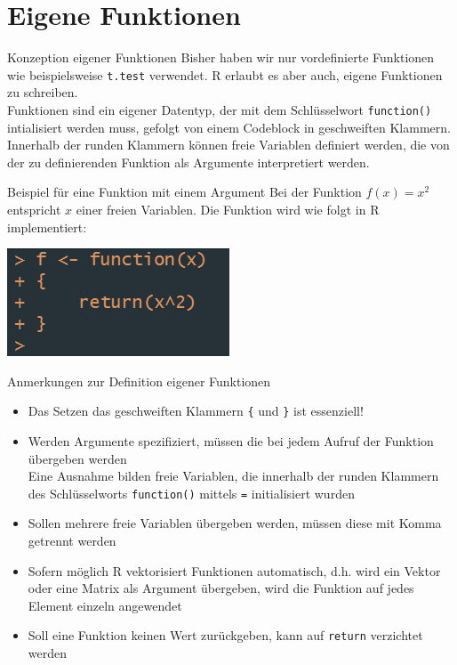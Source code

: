 \documentclass[aspectratio = 169]{chariteBeamer}
\begin{document}
\section{Eigene Funktionen}

\begin{frame}[fragile]{Konzeption eigener Funktionen}
    Bisher haben wir nur vordefinierte Funktionen wie beispielsweise \verb+t.test+ verwendet. \textsf R erlaubt es aber auch, eigene Funktionen zu schreiben.\bigskip\\
    Funktionen sind ein eigener Datentyp, der mit dem Schlüsselwort \verb+function()+ intialisiert werden muss, gefolgt von einem Codeblock in geschweiften Klammern. Innerhalb der runden Klammern können freie Variablen definiert werden, die von der zu definierenden Funktion als Argumente interpretiert werden. 
\end{frame}

\begin{frame}[fragile]{Beispiel für eine Funktion mit einem Argument}
  Bei der Funktion $f(x) = x^2$ entspricht $x$ einer freien Variablen. Die Funktion wird wie folgt in \textsf R implementiert:\bigskip\\
  \begin{centering}
    \includegraphics[]{func1.png}
  \end{centering}
\end{frame}

\begin{frame}[fragile]{Anmerkungen zur Definition eigener Funktionen}
  \begin{itemize}
    \item Das Setzen das geschweiften Klammern \verb+{+ und \verb+}+ ist essenziell!
    \item Werden Argumente spezifiziert, müssen die bei jedem Aufruf der Funktion übergeben werden\\Eine Ausnahme bilden freie Variablen, die innerhalb der runden Klammern des Schlüsselworts \verb+function()+ mittels \verb+=+ initialisiert wurden
    \item Sollen mehrere freie Variablen übergeben werden, müssen diese mit Komma getrennt werden 
    \item Sofern möglich \textsf R vektorisiert Funktionen automatisch, d.h. wird ein Vektor oder eine Matrix als Argument übergeben, wird die Funktion auf jedes Element einzeln angewendet
    \item Soll eine Funktion keinen Wert zurückgeben, kann auf \verb+return+ verzichtet werden
  \end{itemize}
\end{frame}
\end{document}
